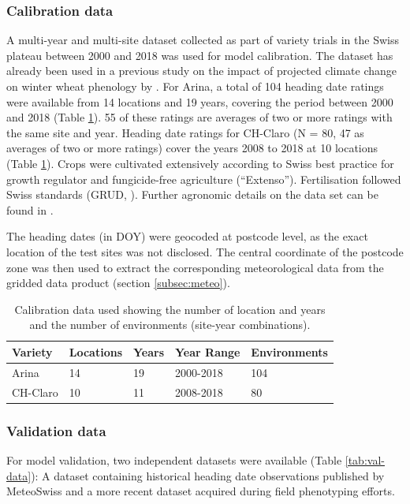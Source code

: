 \subsubsection{Calibration data}
\label{subsubsec:hd-cal-data}
A multi-year and multi-site dataset collected as part of variety trials in the Swiss plateau between 2000 and 2018 was used for model calibration. The dataset has already been used in a previous study on the impact of projected climate change on winter wheat phenology by \cite{rogger_can_2021}. For Arina, a total of 104 heading date ratings were available from 14 locations and 19 years, covering the period between 2000 and 2018 (Table \ref{tab:cal-data}). 55 of these ratings are averages of two or more ratings with the same site and year. Heading date ratings for CH-Claro (N = 80, 47 as averages of two or more ratings) cover the years 2008 to 2018 at 10 locations (Table \ref{tab:cal-data}). Crops were cultivated extensively according to Swiss best practice for growth regulator and fungicide-free agriculture (``Extenso''). Fertilisation followed Swiss standards (GRUD, \cite{carlen_grundlagen_2017}). Further agronomic details on the data set can be found in \cite{rogger_can_2021}.

The heading dates (in \gls{DOY}) were geocoded at postcode level, as the exact location of the test sites was not disclosed. The central coordinate of the postcode zone was then used to extract the corresponding meteorological data from the gridded data product (section \ref{subsec:meteo}). 

\begin{table}[H]
\caption{Calibration data used showing the number of location and years and the number of environments (site-year combinations).}
\centering
\label{tab:cal-data}
\begin{tabular}{@{}lllll@{}}
\toprule
\textbf{Variety}  & \textbf{Locations} & \textbf{Years} & \textbf{Year Range} & \textbf{Environments}   \\ \midrule
Arina    & 14        & 19    & 2000-2018  & 104 \\
CH-Claro & 10        & 11    & 2008-2018  & 80  \\ \bottomrule
\end{tabular}
\end{table}

\subsubsection{Validation data}
\label{subsubsec:hd-val-data}
For model validation, two independent datasets were available (Table \ref{tab:val-data}): A dataset containing historical heading date observations published by MeteoSwiss and a more recent dataset acquired during field phenotyping efforts.

